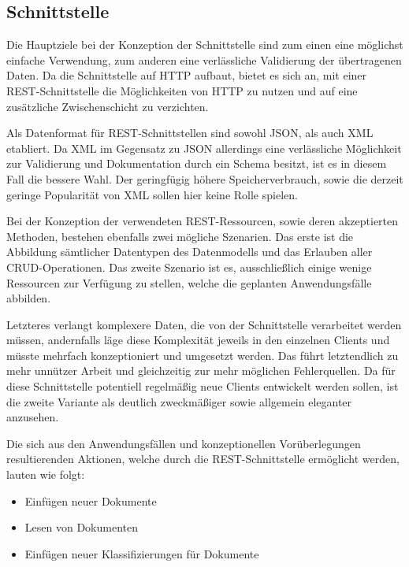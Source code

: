 \subsection{Schnittstelle}
Die Hauptziele bei der Konzeption der Schnittstelle sind zum einen eine möglichst
einfache Verwendung, zum anderen eine verlässliche Validierung der übertragenen Daten.
Da die Schnittstelle auf HTTP aufbaut, bietet es sich an, mit einer REST-Schnittstelle
die Möglichkeiten von HTTP zu nutzen und auf eine zusätzliche Zwischenschicht
zu verzichten.

Als Datenformat für REST-Schnittstellen sind sowohl JSON, als auch XML etabliert.
Da XML im Gegensatz zu JSON allerdings eine verlässliche Möglichkeit zur Validierung
und Dokumentation durch ein Schema besitzt, ist es in diesem Fall die bessere Wahl.
Der geringfügig höhere Speicherverbrauch, sowie die derzeit geringe Popularität
von XML sollen hier keine Rolle spielen.

Bei der Konzeption der verwendeten REST-Ressourcen, sowie deren akzeptierten Methoden,
bestehen ebenfalls zwei mögliche Szenarien. Das erste ist die Abbildung sämtlicher
Datentypen des Datenmodells und das Erlauben aller CRUD-Operationen.
Das zweite Szenario ist es, ausschließlich einige wenige Ressourcen zur Verfügung
zu stellen, welche die geplanten Anwendungsfälle abbilden.

Letzteres verlangt komplexere Daten, die von der Schnittstelle verarbeitet werden müssen,
andernfalls läge diese Komplexität jeweils in den einzelnen Clients und müsste
mehrfach konzeptioniert und umgesetzt werden. Das führt letztendlich zu mehr
unnützer Arbeit und gleichzeitig zur mehr möglichen Fehlerquellen.
Da für diese Schnittstelle potentiell regelmäßig neue Clients entwickelt werden sollen,
ist die zweite Variante als deutlich zweckmäßiger sowie allgemein eleganter anzusehen.

Die sich aus den Anwendungsfällen und konzeptionellen Vorüberlegungen resultierenden
Aktionen, welche durch die REST-Schnittstelle ermöglicht werden, lauten wie folgt:
\begin{itemize}
	\item Einfügen neuer Dokumente
	\item Lesen von Dokumenten
	\item Einfügen neuer Klassifizierungen für Dokumente
\end{itemize}
